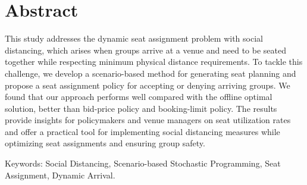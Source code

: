 
\section*{Abstract}

This study addresses the dynamic seat assignment problem with social distancing, which arises when groups arrive at a venue and need to be seated together while respecting minimum physical distance requirements. To tackle this challenge, we develop a scenario-based method for generating seat planning and propose a seat assignment policy for accepting or denying arriving groups. We found that our approach performs well compared with the offline optimal solution, better than bid-price policy and booking-limit policy. The results provide insights for policymakers and venue managers on seat utilization rates and offer a practical tool for implementing social distancing measures while optimizing seat assignments and ensuring group safety.


Keywords: Social Distancing, Scenario-based Stochastic Programming, Seat Assignment, Dynamic Arrival.


